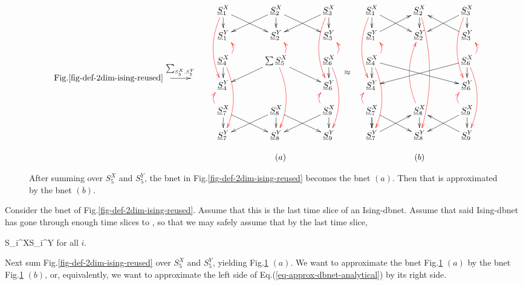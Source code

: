\begin{figure}[h!]
$$
\begin{array}{ccc}
\bcen
\text{Fig.\ref{fig-def-2dim-ising-reused}}
\xymatrix{\ar[r]^{\sum_{S^X_5,S_5^Y}}&
}
\ecen
&
\bcen
\xymatrix@R=1pc@C=3pc{
\rvS_1^X\ar[dr]\ar[d]
\ar@[red]@/_1pc/[ddd]
&\rvS_2^X\ar[dl]\ar[dr]\ar[d]
&\rvS_3^X\ar[dl]\ar[d]
\ar@[red]@/_1pc/[ddd]
\\
\rvS_1^Y
&\rvS_2^Y
&\rvS_3^Y
\\
\rvS_4^X\ar[d]
\ar@[red]@/_1pc/[u]
\ar@[red]@/^1pc/[ddd]
&\sum \rvS_5^X 
\ar[dl]\ar[dr]\ar@[red]@/^1pc/[ddd]
\ar@[red]@/_1pc/[u]
&\rvS_6^X\ar[d]
\ar@[red]@/_1pc/[u]
\ar@[red]@/^1pc/[ddd]
\\
\rvS_4^Y
&
&\rvS_6^Y
\\
\rvS_7^X\ar[dr]\ar[d]
\ar@[red]@/^1pc/[u]
&\rvS_8^X\ar[dl]\ar[dr]\ar[d]
&\rvS_9^X\ar[dl]\ar[d]
\ar@[red]@/^1pc/[u]
\\
\rvS_7^Y
&\rvS_8^Y
&\rvS_9^Y
}
\ecen
\approx
&
\bcen
\xymatrix@R=1pc@C=3pc{
\rvS_1^X\ar[d]\ar[dr]
\ar@[red]@/_1pc/[ddd]
&\rvS_2^X\ar@[red]@/^1pc/[ddddd]\ar[d]
&\rvS_3^X\ar[d]\ar[dl]
\ar@[red]@/_1pc/[ddd]
\\
\rvS_1^Y\ar[ur]
&\rvS_2^Y
&\rvS_3^Y\ar[ul]
\\
\rvS_4^X\ar[d]\ar[drr]
\ar@[red]@/_1pc/[u]
\ar@[red]@/^1pc/[ddd]
&
&\rvS_6^X\ar[d]\ar[dll]
\ar@[red]@/_1pc/[u]
\ar@[red]@/^1pc/[ddd]
\\
\rvS_4^Y
&
&\rvS_6^Y
\\
\rvS_7^X\ar[d]\ar[dr]\ar[d]
\ar@[red]@/^1pc/[u]
&\rvS_8^X\ar@[red]@/^1pc/[uuu]\ar[d]
&\rvS_9^X\ar[d]\ar[dl]
\ar@[red]@/^1pc/[u]
\\
\rvS_7^Y\ar[ur]
&\rvS_8^Y
&\rvS_9^Y\ar[ul]
}
\ecen
\\
\\
&(a)&(b)
\end{array}
$$
\caption{After summing over $S_5^X$ and $S_5^Y$, the bnet in Fig.\ref{fig-def-2dim-ising-reused} 
becomes the bnet $(a)$. Then that is approximated by the
bnet $(b)$.}
\label{fig-2-dim-ising-sum-s5}
\end{figure}

Consider the bnet of Fig.\ref{fig-def-2dim-ising-reused}.
Assume that this is the last time slice of an Ising-dbnet.
Assume that said Ising-dbnet
has gone through 
enough time slices to , so that
we may safely assume that
by the last time slice,


\beq
S_i^X\approx S_i^Y
\label{eq-X-Y-spins}
\eeq
for all $i$.

Next sum Fig.\ref{fig-def-2dim-ising-reused} over 
$S_5^X$ and $S_5^Y$,
yielding
Fig.\ref{fig-2-dim-ising-sum-s5}
$(a)$. We want
to approximate the bnet
Fig.\ref{fig-2-dim-ising-sum-s5}
$(a)$ by the bnet
Fig.\ref{fig-2-dim-ising-sum-s5}
$(b)$, or, equivalently,
we want to approximate
the left side
of Eq.(\ref{eq-approx-dbnet-analytical})
by its right side.


